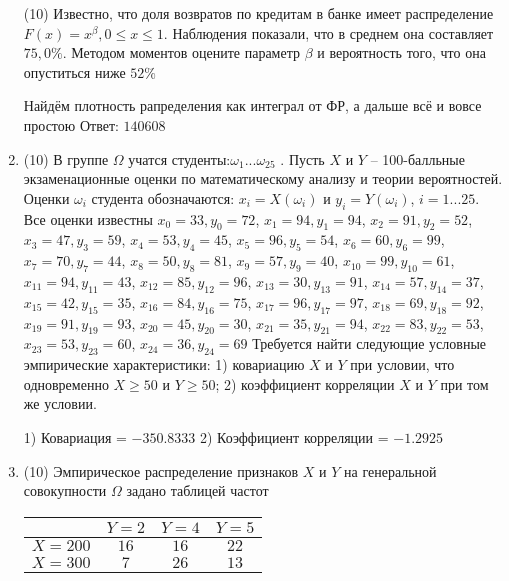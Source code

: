 \documentclass[a4paper,12pt]{article}
\begin{document}
\begin{enumerate}
(10) Известно, что доля возвратов по кредитам в банке имеет распределение $F(x) = x ^{\beta}, 0 \leqslant x \leqslant 1$.
Наблюдения показали, что в среднем она составляет $75,0\%$. Методом моментов оцените параметр $\beta$ и
вероятность того, что она опуститься ниже $52\%$




Найдём плотность рапределения как интеграл от ФР, а дальше всё и вовсе простою Ответ: $140608$


\item


(10) В группе $\Omega$ учатся студенты:$\omega _{1}...\omega _{25}$ . Пусть $X$ и $Y$ – 100-балльные экзаменационные оценки по
математическому анализу и теории вероятностей. Оценки $\omega _{i}$ студента обозначаются: $x _{i} = X(\omega _{i})$ и $y _{i} = Y(\omega _{i})$, $i = 1...25$. Все оценки известны
$x _{0} = 33, y _{0} = 72$, $x _{1} = 94, y _{1} = 94$, $x _{2} = 91, y _{2} = 52$, $x _{3} = 47, y _{3} = 59$, $x _{4} = 53, y _{4} = 45$, $x _{5} = 96, y _{5} = 54$, $x _{6} = 60, y _{6} = 99$, $x _{7} = 70, y _{7} = 44$, $x _{8} = 50, y _{8} = 81$, $x _{9} = 57, y _{9} = 40$, $x _{10} = 99, y _{10} = 61$, $x _{11} = 94, y _{11} = 43$, $x _{12} = 85, y _{12} = 96$, $x _{13} = 30, y _{13} = 91$, $x _{14} = 57, y _{14} = 37$, $x _{15} = 42, y _{15} = 35$, $x _{16} = 84, y _{16} = 75$, $x _{17} = 96, y _{17} = 97$, $x _{18} = 69, y _{18} = 92$, $x _{19} = 91, y _{19} = 93$, $x _{20} = 45, y _{20} = 30$, $x _{21} = 35, y _{21} = 94$, $x _{22} = 83, y _{22} = 53$, $x _{23} = 53, y _{23} = 60$, $x _{24} = 36, y _{24} = 69$
Требуется
найти следующие условные эмпирические характеристики: 1) ковариацию $X$ и $Y$ при условии, что одновременно $X \geqslant 50$
 и $Y \geqslant 50$; 2) коэффициент корреляции $X$ и $Y$ при том же условии.




1) Ковариация = $-350.8333$
2) Коэффициент корреляции = $-1.2925$


\item


(10) Эмпирическое распределение признаков $X$ и $Y$ на генеральной совокупности $\Omega$ задано таблицей частот  
 
\begin{tabular}{ | c | c | c | c | }
\hline
 & $Y = 2$ & $Y = 4$ & $Y = 5$  \\ \hline
$X = 200$ & $16$ & $16$ & $22$\\ \hline
$X = 300$ & $7$ & $26$ & $13$\\
\hline
\end{tabular}


\end{enumerate}
\end{document}
